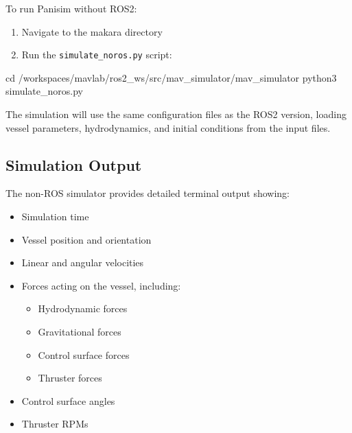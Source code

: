 \documentclass[
  letterpaper,
  DIV=11,
  numbers=noendperiod]{scrreprt}
\newenvironment{Shaded}{\begin{snugshade}}{\end{snugshade}}
\newcommand{\BuiltInTok}[1]{\textcolor[rgb]{0.00,0.23,0.31}{#1}}
\newcommand{\ExtensionTok}[1]{\textcolor[rgb]{0.00,0.23,0.31}{#1}}
\newcommand{\NormalTok}[1]{\textcolor[rgb]{0.00,0.23,0.31}{#1}}
\providecommand{\tightlist}{%
  \setlength{\itemsep}{0pt}\setlength{\parskip}{0pt}}\usepackage{longtable,booktabs,array}
\begin{document}

To run Panisim without ROS2:

\begin{enumerate}
\def\labelenumi{\arabic{enumi}.}
\tightlist
\item
  Navigate to the makara directory
\item
  Run the \texttt{simulate\_noros.py} script:
\end{enumerate}

\begin{Shaded}
\begin{Highlighting}[]
\BuiltInTok{cd}\NormalTok{ /workspaces/mavlab/ros2\_ws/src/mav\_simulator/mav\_simulator}
\ExtensionTok{python3}\NormalTok{ simulate\_noros.py}
\end{Highlighting}
\end{Shaded}

The simulation will use the same configuration files as the ROS2
version, loading vessel parameters, hydrodynamics, and initial
conditions from the input files.

\subsection*{Simulation Output}\label{simulation-output}

The non-ROS simulator provides detailed terminal output showing:

\begin{itemize}
\tightlist
\item
  Simulation time
\item
  Vessel position and orientation
\item
  Linear and angular velocities
\item
  Forces acting on the vessel, including:

  \begin{itemize}
  \tightlist
  \item
    Hydrodynamic forces
  \item
    Gravitational forces
  \item
    Control surface forces
  \item
    Thruster forces
  \end{itemize}
\item
  Control surface angles
\item
  Thruster RPMs
\end{itemize}
\end{document}
